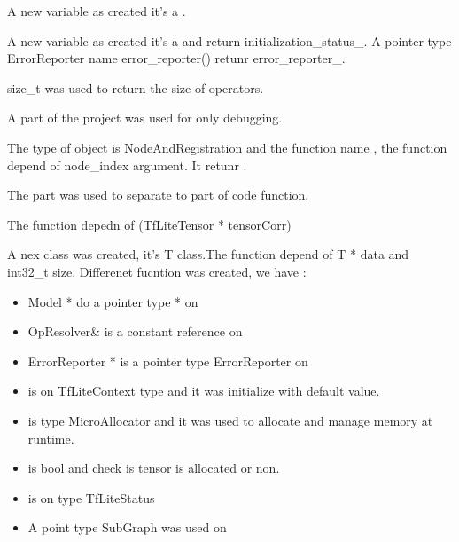 A new variable as created it's a . 

A new variable as created it's a  and return initialization\_status\_. 
A pointer type ErrorReporter name error\_reporter() retunr error\_reporter\_. 

size\_t  was used to return the size of operators. 

A part of the project was used for only debugging. 

The type of object is NodeAndRegistration and the function name , the function depend of node\_index argument. It retunr .

\begin{center}
    \label{Figure:MicroErrorRep}
\end{center}
The  part was used to separate to part of code function. 

The function  depedn of (TfLiteTensor * tensorCorr)

A nex class was created, it's T class.The function  depend of T * data and int32\_t size. Differenet fucntion was created, we have : 

\begin{itemize}	
    \item Model * do a pointer type * on 
    \item OpResolver\&  is a constant reference on 
    \item ErrorReporter * is a pointer type ErrorReporter on 
    \item {} is on TfLiteContext type and it was initialize with default value. 
    \item {} is type MicroAllocator and it was used to allocate and manage memory at runtime.
    \item {} is bool and check is tensor is allocated or non. 
    \item {}is on type TfLiteStatus
    \item A point type SubGraph was used on 
\end{itemize}

